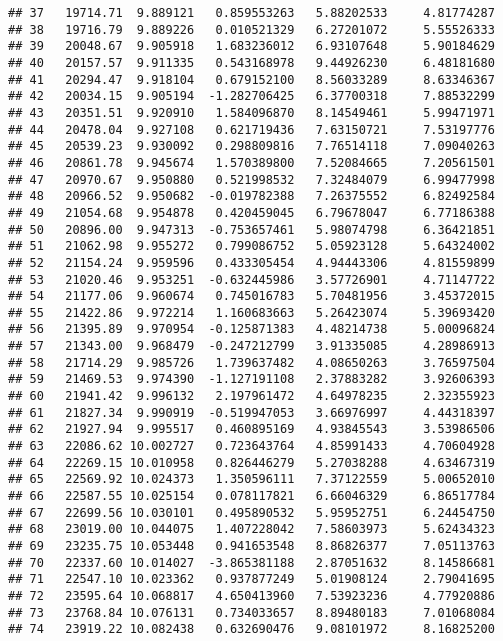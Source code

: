 \documentclass[
]{article}
\begin{document}
\begin{verbatim}
## 37   19714.71  9.889121   0.859553263   5.88202533     4.81774287
## 38   19716.79  9.889226   0.010521329   6.27201072     5.55526333
## 39   20048.67  9.905918   1.683236012   6.93107648     5.90184629
## 40   20157.57  9.911335   0.543168978   9.44926230     6.48181680
## 41   20294.47  9.918104   0.679152100   8.56033289     8.63346367
## 42   20034.15  9.905194  -1.282706425   6.37700318     7.88532299
## 43   20351.51  9.920910   1.584096870   8.14549461     5.99471971
## 44   20478.04  9.927108   0.621719436   7.63150721     7.53197776
## 45   20539.23  9.930092   0.298809816   7.76514118     7.09040263
## 46   20861.78  9.945674   1.570389800   7.52084665     7.20561501
## 47   20970.67  9.950880   0.521998532   7.32484079     6.99477998
## 48   20966.52  9.950682  -0.019782388   7.26375552     6.82492584
## 49   21054.68  9.954878   0.420459045   6.79678047     6.77186388
## 50   20896.00  9.947313  -0.753657461   5.98074798     6.36421851
## 51   21062.98  9.955272   0.799086752   5.05923128     5.64324002
## 52   21154.24  9.959596   0.433305454   4.94443306     4.81559899
## 53   21020.46  9.953251  -0.632445986   3.57726901     4.71147722
## 54   21177.06  9.960674   0.745016783   5.70481956     3.45372015
## 55   21422.86  9.972214   1.160683663   5.26423074     5.39693420
## 56   21395.89  9.970954  -0.125871383   4.48214738     5.00096824
## 57   21343.00  9.968479  -0.247212799   3.91335085     4.28986913
## 58   21714.29  9.985726   1.739637482   4.08650263     3.76597504
## 59   21469.53  9.974390  -1.127191108   2.37883282     3.92606393
## 60   21941.42  9.996132   2.197961472   4.64978235     2.32355923
## 61   21827.34  9.990919  -0.519947053   3.66976997     4.44318397
## 62   21927.94  9.995517   0.460895169   4.93845543     3.53986506
## 63   22086.62 10.002727   0.723643764   4.85991433     4.70604928
## 64   22269.15 10.010958   0.826446279   5.27038288     4.63467319
## 65   22569.92 10.024373   1.350596111   7.37122559     5.00652010
## 66   22587.55 10.025154   0.078117821   6.66046329     6.86517784
## 67   22699.56 10.030101   0.495890532   5.95952751     6.24454750
## 68   23019.00 10.044075   1.407228042   7.58603973     5.62434323
## 69   23235.75 10.053448   0.941653548   8.86826377     7.05113763
## 70   22337.60 10.014027  -3.865381188   2.87051632     8.14586681
## 71   22547.10 10.023362   0.937877249   5.01908124     2.79041695
## 72   23595.64 10.068817   4.650413960   7.53923236     4.77920886
## 73   23768.84 10.076131   0.734033657   8.89480183     7.01068084
## 74   23919.22 10.082438   0.632690476   9.08101972     8.16825200

\end{verbatim}
\end{document}
